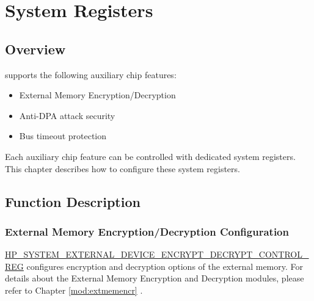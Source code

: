 \documentclass[main\_\_EN.tex]{subfiles}
\begin{document}

\ifglobal
\else
    {\let\clearpage\relax \listoftodos}
    {\let\clearpage\relax \listofdonetodos}
    \tableofcontents
\fi



\chapter{System Registers}
\label{mod:sysreg}
\hypertarget{sysreg}{}


\section{Overview}
\label{sec:sysreg-features}

\chipname{} supports the following auxiliary chip features:

\begin{itemize}
    \item External Memory Encryption/Decryption
    \item Anti-DPA attack security
    \item Bus timeout protection
\end{itemize}

Each auxiliary chip feature can be controlled with dedicated system registers. This chapter describes how to configure these system registers.


\section{Function Description}

\subsection{External Memory Encryption/Decryption Configuration}

\hyperref[regdesc:HPSYSTEMEXTERNALDEVICEENCRYPTDECRYPTCONTROLREG]{HP\_SYSTEM\_EXTERNAL\_DEVICE\_ENCRYPT\_DECRYPT\_CONTROL\_REG} configures encryption and decryption options of the external memory. For details about the External Memory Encryption and Decryption modules, please refer to Chapter \ref{mod:extmemencr}
\textit{}.
\end{document}
